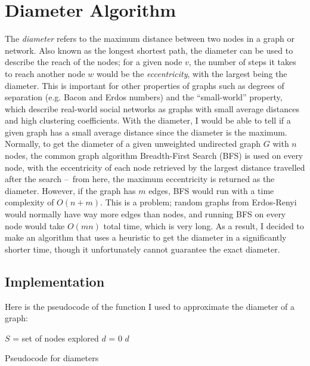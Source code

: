 \documentclass{article}
\begin{document}
\section{Diameter Algorithm}
    The \textit{diameter} refers to the maximum distance between two nodes in
    a graph or network. Also known as the longest shortest path, the diameter
    can be used to describe the reach of the nodes; for a given node $v$, the
    number of steps it takes to reach another node $w$ would be the 
    \textit{eccentricity}, with the largest being the diameter. This is 
    important for other properties of graphs such as degrees of separation 
    (e.g. Bacon and Erdos numbers) and the ``small-world'' property, which 
    describe real-world social networks as graphs with small average distances 
    and high clustering coefficients. With the diameter, I would be able to tell 
    if a given graph has a small average distance since the diameter is the 
    maximum.
    \nextblurb
    Normally, to get the diameter of a given unweighted undirected graph $G$ 
    with $n$ nodes, the common graph algorithm Breadth-First Search (BFS) is
    used on every node, with the eccentricity of each node retrieved by the
    largest distance travelled after the search – from here, the maximum 
    eccentricity is returned as the diameter. However, if the graph has $m$ 
    edges, BFS would run with a time complexity of $O(n + m)$. This is a 
    problem; random graphs from Erdos-Renyi would normally have way more edges
    than nodes, and running BFS on every node would take $O(mn)$ total time, 
    which is very long. As a result, I decided to make an algorithm that uses
    a heuristic to get the diameter in a significantly shorter time, though it 
    unfortunately cannot guarantee the exact diameter.
\subsection{Implementation}
    Here is the pseudocode of the function I used to approximate the diameter of 
    a graph:
    \begin{algorithm}

        \BlankLine
        $S$ = set of nodes explored\;
        $d$ = 0\;
        \Return $d$\;
        \caption{Pseudocode for diameters}
    \end{algorithm}
\end{document}
